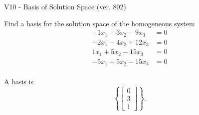 \begin{exercise}
  \begin{exerciseTitle}V10 - Basis of Solution Space (ver. 802)\end{exerciseTitle}
  \begin{exerciseStatement}
    Find a basis for the solution space of the homogeneous system 
\begin{align*}
 -1 x_ 1 + 3 x_ 2 -9 x_ 3 &= 0  \\ 
  -2 x_ 1 -4 x_ 2 + 12 x_ 3 &= 0  \\ 
  1 x_ 1 + 5 x_ 2 -15 x_ 3 &= 0  \\ 
  -5 x_ 1 + 5 x_ 2 -15 x_ 3 &= 0  \\ 
 \end{align*}


 
  \end{exerciseStatement}

  \begin{exerciseAnswer}
   A basis is   
\[\left\{\left[\begin{array}{c}
0 \\
3 \\
1
\end{array}\right]\right\}.\]

  


  \end{exerciseAnswer}
\end{exercise}